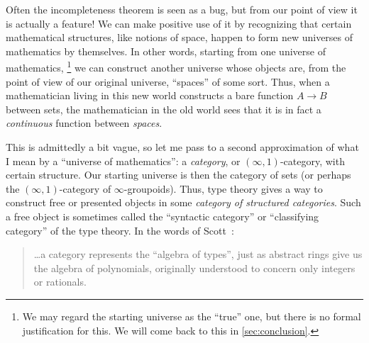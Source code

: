 \documentclass[10pt]{article}
\def\oo{\ensuremath{\infty}}
\def\io{\ensuremath{(\oo,1)}}
\numberwithin{equation}{section}
\begin{document}
Often the incompleteness theorem
is seen as a bug, but from our point of view
it is actually a feature!
We can make positive use of it by recognizing that certain mathematical structures, like notions of space, %
happen to form new universes of mathematics by themselves.
%
In other words, starting from one universe of mathematics,%
\footnote{We may regard the starting universe as the ``true'' one, but there is no formal justification for this.
  We will come back to this in \cref{sec:conclusion}.}
we can construct another universe whose objects are, from the point of view of our original universe, ``spaces'' of some sort.
Thus, when a mathematician living in this new world constructs a bare function $A\to B$ between sets, the mathematician in the old world sees that it is in fact a \emph{continuous} function between \emph{spaces}.

This is admittedly a bit vague, so
let me pass to a second approximation of what I mean by a ``universe of mathematics'': a \emph{category}, or \io-category, with certain structure.
Our starting universe is then the category of sets (or perhaps the \io-category of \oo-groupoids).
Thus, type theory gives a way to construct free or presented objects in some \emph{category of structured categories}.
Such a free object is sometimes called the ``syntactic category'' or ``classifying category'' of the type theory. %
In the words of Scott~\cite{scott:ttalt}:
\begin{quote}
  \dots a category represents the ``algebra of types'', just as abstract rings give us the algebra of polynomials, originally understood to concern only integers or rationals.
\end{quote}
\end{document}
